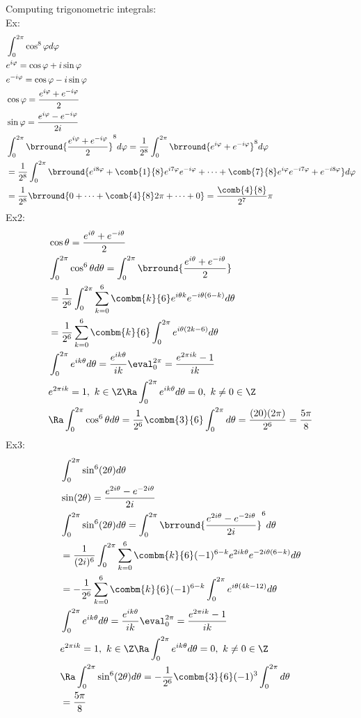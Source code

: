 Computing trigonometric integrals:\\
Ex:
\begin{align*}
    &\int_0^{2\pi}\cos^8\varphi d\varphi\\
    &e^{i\varphi}=\cos\varphi+i\sin\varphi\\
    &e^{-i\varphi}=\cos\varphi-i\sin\varphi\\
    &\cos\varphi=\frac{e^{i\varphi}+e^{-i\varphi}}{2}\\
    &\sin\varphi=\frac{e^{i\varphi}-e^{-i\varphi}}{2i}\\
    &\int_0^{2\pi}\brround{\frac{e^{i\varphi}+e^{-i\varphi}}{2}}^8d\varphi=\frac{1}{2^8}\int_0^{2\pi}\brround{e^{i\varphi}+e^{-i\varphi}}^8d\varphi\\
    &=\frac{1}{2^8}\int_0^{2\pi}\brround{e^{i8\varphi}+\comb{1}{8}e^{i7\varphi}e^{-i\varphi}+\cdots+\comb{7}{8}e^{i\varphi}e^{-i7\varphi}+e^{-i8\varphi}}d\varphi\\
    &=\frac{1}{2^8}\brround{0+\cdots+\comb{4}{8}2\pi+\cdots+0}=\frac{\comb{4}{8}}{2^7}\pi
\end{align*}
Ex2:
\begin{align*}
    &\cos\theta=\frac{e^{i\theta}+e^{-i\theta}}{2}\\
    &\int_0^{2\pi}\cos^6\theta d\theta=\int_0^{2\pi}\brround{\frac{e^{i\theta}+e^{-i\theta}}{2}}\\
    &=\frac{1}{2^6}\int_0^{2\pi}\sum_{k=0}^6\combm{k}{6}e^{i\theta k}e^{-i\theta(6-k)}d\theta\\
    &=\frac{1}{2^6}\sum_{k=0}^6\combm{k}{6}\int_0^{2\pi}e^{i\theta(2k-6)}d\theta\\
    &\int_0^{2\pi}e^{ik\theta}d\theta=\frac{e^{ik\theta}}{ik}\eval_0^{2\pi}=\frac{e^{2\pi ik}-1}{ik}\\
    &e^{2\pi ik}=1,\ k\in\Z\Ra \int_0^{2\pi}e^{ik\theta}d\theta=0,\ k\neq0\in\Z\\
    &\Ra \int_0^{2\pi}\cos^6\theta d\theta=\frac{1}{2^6}\combm{3}{6}\int_0^{2\pi}d\theta=\frac{(20)(2\pi)}{2^6}=\frac{5\pi}{8}
\end{align*}
Ex3:
\begin{align*}
    &\int_0^{2\pi}\sin^6(2\theta)d\theta\\
    &\sin(2\theta)=\frac{e^{2i\theta}-e^{-2i\theta}}{2i}\\
    &\int_0^{2\pi}\sin^6(2\theta)d\theta=\int_0^{2\pi}\brround{\frac{e^{2i\theta}-e^{-2i\theta}}{2i}}^6d\theta\\
    &=\frac{1}{(2i)^6}\int_0^{2\pi}\sum_{k=0}^6\combm{k}{6}(-1)^{6-k}e^{2ik\theta}e^{-2i\theta(6-k)}d\theta\\
    &=-\frac{1}{2^6}\sum_{k=0}^6\combm{k}{6}(-1)^{6-k}\int_0^{2\pi}e^{i\theta(4k-12)}d\theta\\
    &\int_0^{2\pi}e^{ik\theta}d\theta=\frac{e^{ik\theta}}{ik}\eval_0^{2\pi}=\frac{e^{2\pi ik}-1}{ik}\\
    &e^{2\pi ik}=1,\ k\in\Z\Ra \int_0^{2\pi}e^{ik\theta}d\theta=0,\ k\neq0\in\Z\\
    &\Ra \int_0^{2\pi}\sin^6(2\theta)d\theta=-\frac{1}{2^6}\combm{3}{6}(-1)^3\int_0^{2\pi} d\theta\\
    &=\frac{5\pi}{8}
\end{align*}
